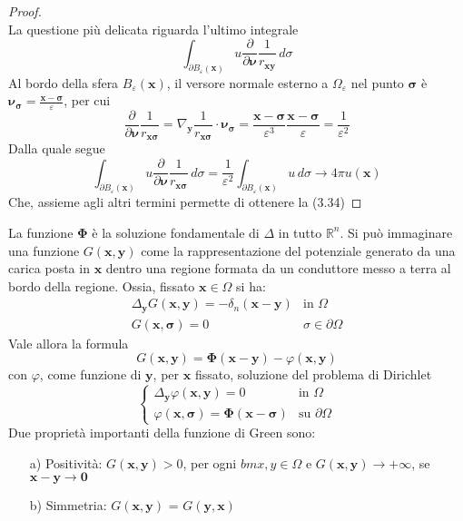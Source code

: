 \documentclass[a4paper,12pt, draft]{article}
\theoremstyle{break}
\let\epsilon\varepsilon
\let\phi\varphi
\numberwithin{equation}{section}
\begin{document}
\begin{proof}
\begin{equation}
\end{equation}
La questione più delicata riguarda l'ultimo integrale
\[
  \int_{\partial B_{\epsilon}(\bm{x})} u\frac{\partial}{\partial \bm{\nu}} \frac{1}{r_{\bm{xy}}} \, d\sigma
\]
Al bordo della sfera \(B_{\epsilon}(\bm{x})\), il versore normale esterno a \(\Omega_{\epsilon}\) nel punto \(\bm{\sigma}\) è \(\bm{\nu_{\sigma}} = \frac{\bm{x}-\bm{\sigma}}{\epsilon}\), per cui
\[
  \frac{\partial}{\partial \bm{\nu}} \frac{1}{r_{\bm{x\sigma}}} = \nabla_{\bm{y}}\frac{1}{r_{\bm{x\sigma}}} \cdot \bm{\nu_{\sigma}} = \frac{\bm{x} - \bm{\sigma}}{\epsilon^3} \frac{\bm{x} - \bm{\sigma}}{\epsilon} = \frac{1}{\epsilon^2}
\]
Dalla quale segue
\begin{equation}
  \int_{\partial B_{\epsilon}(\bm{x})} u \frac{\partial}{\partial \bm{\nu}} \frac{1}{r_{\bm{x\sigma}}} \, d\sigma = \frac{1}{\epsilon^2} \int_{\partial B_{\epsilon}(\bm{x})} u \, d\sigma \to 4\pi u(\bm{x})
\end{equation}
Che, assieme agli altri termini permette di ottenere la (3.34)
\end{proof}
La funzione \(\bm{\Phi}\) è la soluzione fondamentale di \(\Delta\) in tutto \(\mathbb{R}^n\). Si può immaginare una funzione \(G(\bm{x,y})\) come la rappresentazione del potenziale generato da una carica posta in \(\bm{x}\) dentro una regione formata da un conduttore messo a terra al bordo della regione. Ossia, fissato \(\bm{x}\in \Omega\)
si ha:
\[
  \begin{array}{ll}
    \Delta_{\bm{y}} G(\bm{x,y}) = -\delta_n (\bm{x} - \bm{y}) & \mbox{in } \Omega \\
    G(\bm{x, \sigma})= 0 & \sigma \in \partial \Omega
  \end{array}
\]
Vale allora la formula 
\[
  G(\bm{x,y}) = \bm{\Phi}(\bm{x} - \bm{y}) - \phi(\bm{x,y})
\]
con \(\phi\), come funzione di \(\bm{y}\), per \(\bm{x}\) fissato, soluzione del problema di Dirichlet
\begin{equation}
  \begin{cases}
    \Delta_{\bm{y}} \phi(\bm{x,y}) = 0 & \mbox{in } \Omega \\
    \phi(\bm{x, \sigma}) = \bm{\Phi}(\bm{x}-\bm{\sigma}) & \mbox{su } \partial \Omega
  \end{cases}
\end{equation} 
Due proprietà importanti della funzione di Green sono:
\begin{itemize}
  \item[a)] Positività: \(G(\bm{x,y}) > 0\), per ogni \(bm{x,y} \in \Omega\) e \(G(\bm{x,y}) \to +\infty\), se \(\bm{x} - \bm{y} \to \bm{0}\)
  \item[b)] Simmetria: \(G(\bm{x,y})\) = \(G(\bm{y,x})\)  
\end{itemize}
\end{document}
